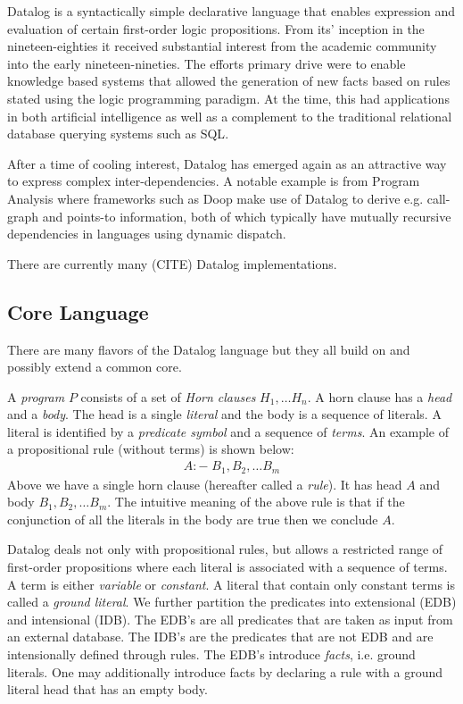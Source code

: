 Datalog is a syntactically simple declarative language that enables expression and evaluation of certain first-order logic propositions. From its' inception in the nineteen-eighties it received substantial interest from the academic community into the early nineteen-nineties\cite{Green:2013:DRQ:2688167.2688168}. The efforts primary drive were to enable knowledge based systems that allowed the generation of new facts based on rules stated using the logic programming paradigm. At the time, this had applications in both artificial intelligence as well as a complement to the traditional relational database querying systems such as SQL\cite{Ceri:1989:YAW:627272.627357}\cite{Bancilhon:1986:AIR:16894.16859}.

\NL
After a time of cooling interest, Datalog has emerged again as an attractive way to express complex inter-dependencies\cite{Green:2013:DRQ:2688167.2688168}. A notable example is from Program Analysis where frameworks such as Doop \cite{Smaragdakis:2010:UDF:2185923.2185939} make use of Datalog to derive e.g. call-graph and points-to information, both of which typically have mutually recursive dependencies in languages using dynamic dispatch.

\NL
There are currently many (CITE) Datalog implementations.

\subsection{Core Language}
There are many flavors of the Datalog language but they all build on and possibly extend a common core. 

\NL
A \textit{program} $P$ consists of a set of \textit{Horn clauses} $H_1, \ldots H_n$. A horn clause has a \textit{head} and a \textit{body}. The head is a single \textit{literal} and the body is a sequence of literals. A literal is identified by a \textit{predicate symbol} and a sequence of \textit{terms}. An example of a propositional rule (without terms) is shown below:
\begin{align*}
A :- \;B_1, B_2, \ldots B_m
\end{align*}
\noindent
Above we have a single horn clause (hereafter called a \textit{rule}). It has head $A$ and body $B_1, B_2, \ldots B_m$. The intuitive meaning of the above rule is that if the conjunction of all the literals in the body are true then we conclude $A$.

\NL
Datalog deals not only with propositional rules, but allows a restricted range of first-order propositions where each literal is associated with a sequence of terms. A term is either \textit{variable} or \textit{constant}. A literal that contain only constant terms is called a \textit{ground literal}. We further partition the predicates into extensional (EDB) and intensional (IDB). The EDB's are all predicates that are taken as input from an external database. The IDB's are the predicates that are not EDB and are intensionally defined through rules. The EDB's introduce \textit{facts}, i.e. ground literals. One may additionally introduce facts by declaring a rule with a ground literal head that has an empty body. 

